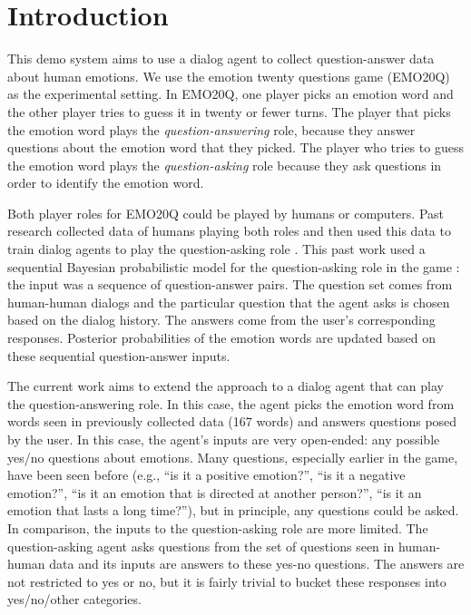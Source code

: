 \documentclass[conference]{IEEEtran}
\begin{document}
\section{Introduction}

This demo system aims to use a dialog agent to collect question-answer
data about human emotions.  We use the emotion twenty questions game
(EMO20Q) as the experimental setting.  In EMO20Q, one player picks an
emotion word and the other player tries to guess it in twenty or fewer
turns. The player that picks the emotion word plays the {\it
  question-answering} role, because they answer questions about the
emotion word that they picked.  The player who tries to guess the
emotion word plays the {\it question-asking} role because they ask
questions in order to identify the emotion word.

Both player roles for EMO20Q could be played by humans or computers.
Past research collected data of humans playing both roles and then
used this data to train dialog agents to play the question-asking role
\cite{Kazemzadeh2012}.  This past work used a sequential Bayesian
probabilistic model for the question-asking role in the game
\cite{Kazemzadeh2012}: the input was a sequence of question-answer
pairs. The question set comes from human-human dialogs and the
particular question that the agent asks is chosen based on the dialog
history. The answers come from the user's corresponding responses.
Posterior probabilities of the emotion words are updated based on
these sequential question-answer inputs.

The current work aims to extend the approach to a dialog agent that
can play the question-answering role. In this case, the agent picks
the emotion word from words seen in previously collected data (167
words) and answers questions posed by the user. In this case, the
agent's inputs are very open-ended: any possible yes/no questions
about emotions.  Many questions, especially earlier in the game, have
been seen before (e.g., ``is it a positive emotion?'', ``is it a
negative emotion?'', ``is it an emotion that is directed at another
person?'', ``is it an emotion that lasts a long time?''), but in
principle, any questions could be asked.  In comparison, the inputs to
the question-asking role are more limited.  The question-asking agent
asks questions from the set of questions seen in human-human data and
its inputs are answers to these yes-no questions. The answers are not
restricted to yes or no, but it is fairly trivial to bucket these
responses into yes/no/other categories.
\end{document}
